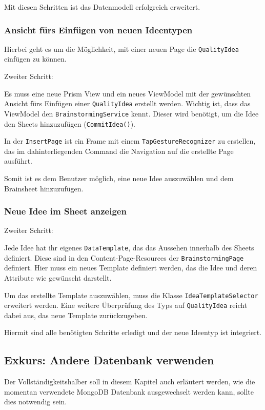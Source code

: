 Mit diesen Schritten ist das Datenmodell erfolgreich erweitert.

\subsubsection{Ansicht fürs Einfügen von neuen Ideentypen}
Hierbei geht es um die Möglichkeit, mit einer neuen Page die \texttt{QualityIdea} einfügen zu können.

\begin{labeling}{Zweiter Schritt:}
	\item[Erster Schritt:]	Es muss eine neue Prism View und ein neues ViewModel mit der gewünschten Ansicht fürs Einfügen einer \texttt{QualityIdea} erstellt werden. Wichtig ist, dass das ViewModel den \texttt{Brainstorming\-Service} kennt. Dieser wird benötigt, um die Idee den Sheets hinzuzufügen (\texttt{CommitIdea()}). 
	\item[Zweiter Schritt:] In der \texttt{InsertPage} ist ein Frame mit einem \texttt{TapGestureRecognizer} zu erstellen, das im dahinterliegenden Command die Navigation auf die erstellte Page ausführt.
\end{labeling}

Somit ist es dem Benutzer möglich, eine neue Idee auszuwählen und dem Brainsheet hinzuzufügen. 

\subsubsection{Neue Idee im Sheet anzeigen}
\begin{labeling}{Zweiter Schritt:}
	\item[Erster Schritt:] Jede Idee hat ihr eigenes \texttt{DataTemplate}, das das Aussehen innerhalb des Sheets definiert. Diese sind in den Content-Page-Resources der \texttt{Brain\-storming\-Page} definiert. Hier muss ein neues Template definiert werden, das die Idee und deren Attribute wie gewünscht darstellt. 
	\item[Zweiter Schritt:] Um das erstellte Template auszuwählen, muss die Klasse \texttt{Idea\-Template\-Selector} erweitert werden. Eine weitere Überprüfung des Typs auf \texttt{Qua\-lity\-Idea} reicht dabei aus, das neue Template zurückzugeben.
\end{labeling}

Hiermit sind alle benötigten Schritte erledigt und der neue Ideentyp ist integriert. 

\subsection{Exkurs: Andere Datenbank verwenden}
Der Vollständigkeitshalber soll in diesem Kapitel auch erläutert werden, wie die momentan verwendete MongoDB Datenbank ausgewechselt werden kann, sollte dies notwendig sein.


